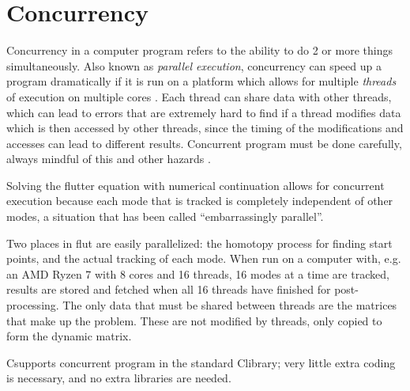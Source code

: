 \documentclass[11pt,openany,twoside]{book}
\numberwithin{equation}{section}		%
\def\Cpp{{C\nolinebreak[4]\hspace{-.05em}\raisebox{.4ex}{\tiny\bf ++}}\:}
\newcommand{\Cmd}[1]{{\sf #1}}
\newcommand{\Newterm}[1]{{\em #1}}	%
\begin{document}
\section{Concurrency}\label{sect:concurrency}
Concurrency in a computer program refers to the ability to do 2 or
more things simultaneously. Also known as \Newterm{parallel execution},
concurrency can speed up a program dramatically if it is run on a platform
which allows for multiple \Newterm{threads} of execution on multiple cores
\cite{williams2009c++}.
Each thread can share data with other threads, which can lead to errors that
are extremely hard to find if a thread modifies data which is then accessed by
other threads, since the timing of the modifications and accesses can lead
to different results. Concurrent program must be done carefully, always mindful
of this and other hazards
\cite{williams2009c++}.
\par
Solving the flutter equation with numerical continuation allows for
concurrent execution because each mode that is tracked is completely
independent of other modes, a situation that has been called
``embarrassingly parallel''.
\par
Two places in \Cmd{flut} are easily parallelized: the homotopy process for
finding start points, and the actual tracking of each mode. When run on a
computer with, e.g. an AMD Ryzen 7 with 8 cores and 16 threads, 16 modes
at a time are tracked, results are stored and fetched when all 16 threads have
finished for post-processing.
The only data that must be shared between threads are the matrices that
make up the problem. These are not modified by threads, only copied to form
the dynamic matrix.
\par
\Cpp supports concurrent program in the standard \Cpp library; very little extra
coding is necessary, and no extra libraries are needed.
\end{document}
